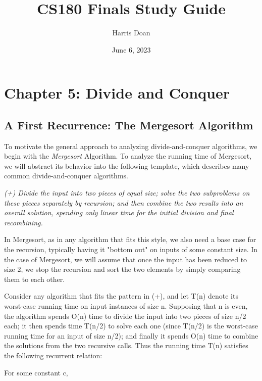 \documentclass{article}
\title{CS180 Finals Study Guide}
\author{Harris Doan}
\date{June 6, 2023}
\begin{document}
\maketitle


\section{Chapter 5: Divide and Conquer}

\subsection{A First Recurrence: The Mergesort Algorithm}

To motivate the general approach to analyzing divide-and-conquer algorithms, we begin with the \emph{Mergesort} Algorithm. 
To analyze the running time of Mergesort, we will abstract its behavior into the following template, which describes many common divide-and-conquer algorithms.

\medskip 

\emph{(+) Divide the input into two pieces of equal size; solve the two subproblems on these pieces separately by recursion; and then combine the two results into an overall solution, spending only linear time for the initial division and final recombining.}

In Mergesort, as in any algorithm that fits this style, we also need a base case for the recursion, typically having it "bottom out" on inputs of some constant size. In the case of Mergesort, we will assume that once the input has been reduced to size 2, we stop the recursion and sort the two elements by simply comparing them to each other.

\medskip
Consider any algorithm that fits the pattern in (+), and let T(n) denote its worst-case running time on input instances of size n. Supposing that n is even, the algorithm spends O(n) time to divide the input into two pieces of size n/2 each; it then spends time T(n/2) to solve each one (since T(n/2) is the worst-case running time for an input of size n/2); and finally it spends O(n) time to combine the solutions from the two recursive calls. Thus the running time T(n) satisfies the following recurrent relation:

\medskip

For some constant c, 

\medskip
\end{document}
